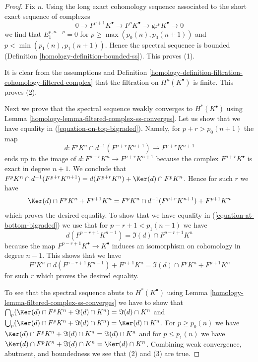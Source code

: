 \begin{proof}

Fix $n$. Using the long exact cohomology sequence associated to
the short exact sequence of complexes
$$
0 \to F^{p + 1}K^\bullet \to F^pK^\bullet \to \text{gr}^pK^\bullet \to 0
$$
we find that $E_1^{p, n - p} = 0$ for $p \geq \max(p_0(n), p_0(n + 1))$ and
$p < \min(p_1(n), p_1(n + 1))$. Hence the spectral sequence is bounded
(Definition \ref{homology-definition-bounded-ss}). This proves (1).

\medskip\noindent
It is clear from the assumptions and
Definition \ref{homology-definition-filtration-cohomology-filtered-complex}
that the filtration on $H^n(K^\bullet)$ is finite. This proves (2).

\medskip\noindent
Next we prove that the spectral sequence weakly converges to
$H^*(K^\bullet)$ using
Lemma \ref{homology-lemma-filtered-complex-ss-converges}.
Let us show that we have equality in (\ref{equation-on-top-bigraded}).
Namely, for $p + r > p_0(n + 1)$ the map
$$
d : F^pK^{n} \cap d^{-1}(F^{p + r}K^{n + 1}) \to F^{p + r}K^{n + 1}
$$
ends up in the image of $d : F^{p + r}K^n \to F^{p + r}K^{n + 1}$
because the complex $F^{p + r}K^\bullet$ is exact in degree $n + 1$.
We conclude that $F^pK^{n} \cap d^{-1}(F^{p + r}K^{n + 1}) =
d(F^{p + r}K^n) + \Ker(d) \cap F^pK^n$. Hence for such $r$ we have
$$
\Ker(d) \cap F^pK^{n} + F^{p + 1}K^{n} =
F^pK^{n} \cap d^{-1}(F^{p + r}K^{n + 1}) + F^{p + 1}K^{n}
$$
which proves the desired equality. To show that we have equality in
(\ref{equation-at-bottom-bigraded}) we use that for $p - r + 1 < p_1(n - 1)$
we have
$$
d(F^{p - r + 1}K^{n - 1}) = \Im(d) \cap F^{p - r + 1}K^n
$$
because the map $F^{p - r + 1}K^\bullet \to K^\bullet$ induces an
isomorphism on cohomology in degree $n - 1$. This shows that
we have
$$
F^pK^{n} \cap d(F^{p - r + 1}K^{n - 1}) + F^{p + 1}K^{n} =
\Im(d) \cap F^pK^{n} + F^{p + 1}K^{n}
$$
for such $r$ which proves the desired equality.

\medskip\noindent
To see that the spectral sequence abuts to $H^*(K^\bullet)$ using
Lemma \ref{homology-lemma-filtered-complex-ss-converges} we have to show that
$\bigcap_p (\Ker(d) \cap F^pK^n + \Im(d) \cap K^n) = \Im(d) \cap K^n$
and
$\bigcup_p (\Ker(d) \cap F^pK^n + \Im(d) \cap K^n) = \Ker(d) \cap K^n$.
For $p \geq p_0(n)$ we have
$\Ker(d) \cap F^pK^n + \Im(d) \cap K^n = \Im(d) \cap K^n$
and for $p \leq p_1(n)$ we have
$\Ker(d) \cap F^pK^n + \Im(d) \cap K^n = \Ker(d) \cap K^n$.
Combining weak convergence, abutment, and boundedness we see
that (2) and (3) are true.
\end{proof}

